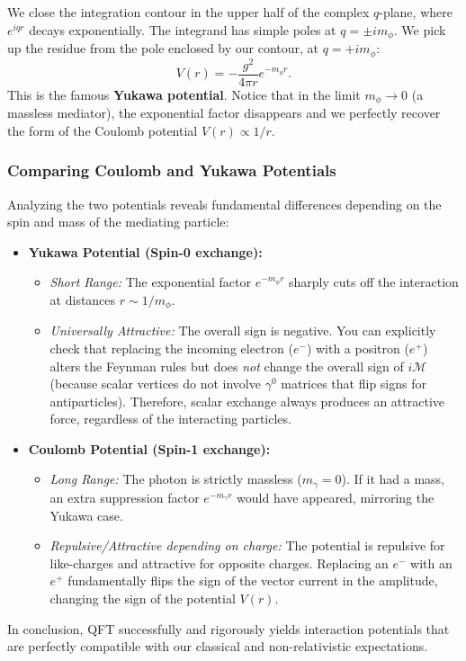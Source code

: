 
We close the integration contour in the upper half of the complex $q$-plane, where $e^{iqr}$ decays exponentially. The integrand has simple poles at $q = \pm i m_\phi$. We pick up the residue from the pole enclosed by our contour, at $q = +im_\phi$:
\[
    V(r) = -\frac{g^2}{4\pi r} e^{-m_\phi r}.
\]
This is the famous \textbf{Yukawa potential}. Notice that in the limit $m_\phi \to 0$ (a massless mediator), the exponential factor disappears and we perfectly recover the form of the Coulomb potential $V(r) \propto 1/r$.

\subsubsection{Comparing Coulomb and Yukawa Potentials}
Analyzing the two potentials reveals fundamental differences depending on the spin and mass of the mediating particle:
\begin{itemize}
    \item \textbf{Yukawa Potential (Spin-0 exchange):}
          \begin{itemize}
              \item \textit{Short Range:} The exponential factor $e^{-m_\phi r}$ sharply cuts off the interaction at distances $r \sim 1/m_\phi$.
              \item \textit{Universally Attractive:} The overall sign is negative. You can explicitly check that replacing the incoming electron ($e^-$) with a positron ($e^+$) alters the Feynman rules but does \textit{not} change the overall sign of $i\mathcal{M}$ (because scalar vertices do not involve $\gamma^0$ matrices that flip signs for antiparticles). Therefore, scalar exchange always produces an attractive force, regardless of the interacting particles.
          \end{itemize}
    \item \textbf{Coulomb Potential (Spin-1 exchange):}
          \begin{itemize}
              \item \textit{Long Range:} The photon is strictly massless ($m_\gamma = 0$). If it had a mass, an extra suppression factor $e^{-m_\gamma r}$ would have appeared, mirroring the Yukawa case.
              \item \textit{Repulsive/Attractive depending on charge:} The potential is repulsive for like-charges and attractive for opposite charges. Replacing an $e^-$ with an $e^+$ fundamentally flips the sign of the vector current in the amplitude, changing the sign of the potential $V(r)$.
          \end{itemize}
\end{itemize}
In conclusion, QFT successfully and rigorously yields interaction potentials that are perfectly compatible with our classical and non-relativistic expectations.